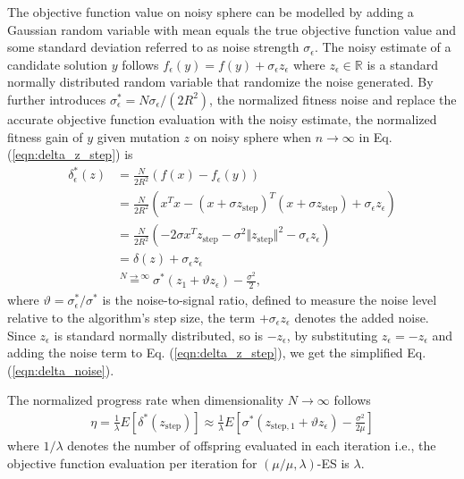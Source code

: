 The objective function value on noisy sphere can be modelled by adding a Gaussian random variable with mean equals the true objective function value and some standard deviation referred to as noise strength $\sigma_\epsilon$. The noisy estimate of a candidate solution $y$ follows $f_{\epsilon}(y) = f(y) + \sigma_{\epsilon} z_\epsilon$ where $z_\epsilon \in \mathbb{R}$ is a standard normally distributed random variable that randomize the noise generated. By further introduces $\sigma_\epsilon^* = N \sigma_\epsilon / (2R^2)$, the normalized fitness noise \cite{1284729} and replace the accurate objective function evaluation with the noisy estimate, the normalized fitness gain of $y$ given mutation $z$ on noisy sphere when $n \rightarrow \infty$ in Eq. (\ref{eqn:delta_z_step}) is
\begin{align}
\delta_\epsilon^* (z)
&=  \frac{N}{2R^2}\left( f(x) - f_\epsilon(y)\right)  \nonumber\\ 
& = \frac{N}{2R^2} (x^Tx - (x+\sigma z_{\text{step}})^T (x+\sigma z_{\text{step}}) +\sigma_\epsilon z_\epsilon) \nonumber\\
& = \frac{N}{2R^2} (-2 \sigma x^Tz_{\text{step}} - \sigma^2 \Vert z_{\text{step}}\Vert^2 -\sigma_\epsilon z_\epsilon) \nonumber\\
& = \delta(z) + \sigma_\epsilon z_\epsilon\nonumber\\
&\overset{N \rightarrow \infty}{=} \sigma^* (z_1 + \vartheta z_\epsilon ) - \frac{\sigma^2}{2}, \label{eqn:delta_noise}{}
\end{align}
where $\vartheta = \sigma_\epsilon^*/\sigma^*$ is the noise-to-signal ratio, defined to measure the noise level relative to the algorithm's step size, the term $+\sigma_\epsilon z_\epsilon$ denotes the added noise. Since $z_\epsilon$ is standard normally distributed, so is $-z_\epsilon$, by substituting $z_\epsilon = -z_\epsilon$ and adding the noise term to Eq. (\ref{eqn:delta_z_step}), we get the simplified Eq. (\ref{eqn:delta_noise}).

The normalized progress rate when dimensionality $N \rightarrow \infty$ follows 
\begin{align}\label{eqn:eta_noise_sphere_raw}{}
\eta = \frac{1}{\lambda}E[ \delta^*(z_{\text{step}})] \approx \frac{1}{\lambda} E \left[ \sigma^* (z_{\text{step},1} + \vartheta z_\epsilon ) - \frac{\sigma^2}{2\mu}  \right]
\end{align}
where $1/\lambda$ denotes the number of offspring evaluated in each iteration i.e., the objective function evaluation per iteration for $(\mu/\mu,\lambda)$-ES is $\lambda$.

